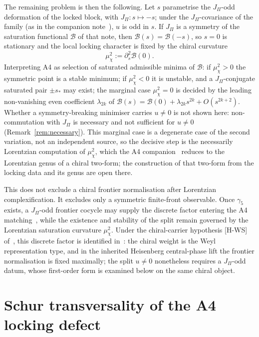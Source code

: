 \documentclass[11pt]{article}
\theoremstyle{definition}
\begin{document}
    The remaining problem is then the following.
    Let $s$ parametrise the $J_\Pi$-odd deformation of the locked block, with $J_\Pi:s\mapsto -s$; under the
    $J_\Pi$-covariance of the family (as in the companion note~\cite{Beau2026bim}), $u$ is odd in $s$.
    If $J_\Pi$ is a symmetry of the saturation functional $\mathcal B$ of that note, then $\mathcal B(s)=\mathcal
      B(-s)$,
    so $s=0$ is stationary and the local locking character is fixed by the chiral curvature
    \begin{equation}
      \label{eq:muchi}
      \mu_\chi^2:=\partial_s^2\mathcal B(0).
    \end{equation}
    Interpreting A4 as selection of saturated admissible minima of $\mathcal B$: if $\mu_\chi^2>0$ the symmetric point
      is
    a stable minimum; if $\mu_\chi^2<0$ it is unstable, and a $J_\Pi$-conjugate saturated pair $\pm s_*$ may exist; the
    marginal case $\mu_\chi^2=0$ is decided by the leading non-vanishing even coefficient $\lambda_{2k}$ of
    $\mathcal B(s)=\mathcal B(0)+\lambda_{2k}s^{2k}+O(s^{2k+2})$.
    Whether a symmetry-breaking minimiser carries $u\neq0$ is not shown here: non-commutation with $J_\Pi$ is necessary
    and not sufficient for $u\neq0$ (Remark~\ref{rem:necessary}).
    This marginal case is a degenerate case of the second variation, not an independent source, so the
    decisive step is the necessarily Lorentzian computation of $\mu_\chi^2$, which the A4 companion~\cite{Beau2026bim}
    reduces to the Lorentzian genus of a chiral two-form; the construction of that two-form from the locking data and
    its genus are open there.

    This does not exclude a chiral frontier normalisation after Lorentzian complexification.
    It excludes only a symmetric finite-front observable.
    Once $\gamma_5$ exists, a $J_\Pi$-odd frontier cocycle may supply the discrete factor entering the A4
    matching~\cite{Beau2026q11of}, while the existence and stability of the split remain governed by the
    Lorentzian saturation curvature $\mu_\chi^2$.
    Under the chiral-carrier hypothesis [H-WS] of~\cite{Beau2026q11of}, this discrete factor is identified
    in~\cite{Beau2026cho}: the chiral weight is the Weyl representation type,
    and in the inherited Heisenberg central-phase lift the frontier normalisation is fixed maximally; the split
    $u\neq0$ nonetheless requires a $J_\Pi$-odd datum, whose first-order form is examined below on the same chiral
    object.

  \section{Schur transversality of the A4 locking defect}
    \label{sec:schur-transversality}
\end{document}
